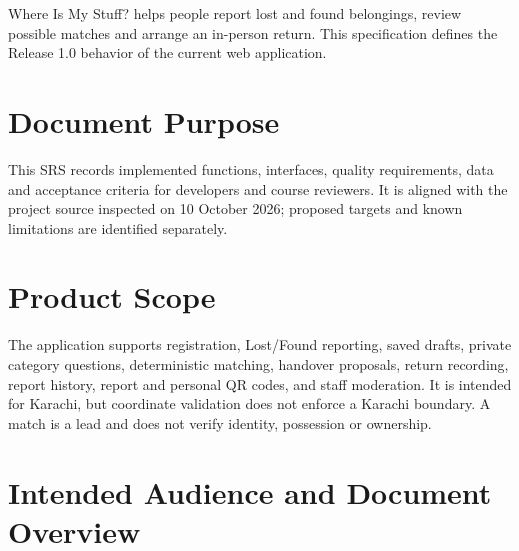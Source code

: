 \documentclass[12pt,a4paper,oneside]{report}
\begin{document}
Where Is My Stuff? helps people report lost and found belongings, review possible matches and arrange an in-person return. This specification defines the Release 1.0 behavior of the current web application.


\section{Document Purpose}

This SRS records implemented functions, interfaces, quality requirements, data and acceptance criteria for developers and course reviewers. It is aligned with the project source inspected on 10 October 2026; proposed targets and known limitations are identified separately.


\section{Product Scope}

The application supports registration, Lost/Found reporting, saved drafts, private category questions, deterministic matching, handover proposals, return recording, report history, report and personal QR codes, and staff moderation. It is intended for Karachi, but coordinate validation does not enforce a Karachi boundary. A match is a lead and does not verify identity, possession or ownership.


\section{Intended Audience and Document Overview}
\end{document}
